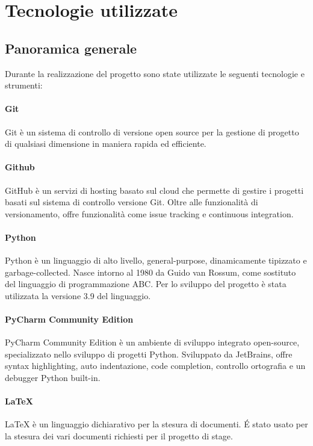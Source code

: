 
\chapter{Tecnologie utilizzate}

\section{Panoramica generale}
Durante la realizzazione del progetto sono state utilizzate le seguenti tecnologie e strumenti:

\subsubsection{Git} 
Git è un sistema di controllo di versione open source per la gestione di progetto di qualsiasi dimensione in maniera rapida ed efficiente. 

\subsubsection{Github}
GitHub è un servizi di hosting basato sul cloud che permette di gestire i progetti basati sul sistema di controllo versione Git. Oltre alle funzionalità di versionamento, offre funzionalità come issue tracking e continuous integration. 


\subsubsection{Python}
Python è un linguaggio di alto livello, general-purpose, dinamicamente tipizzato e garbage-collected. Nasce intorno al 1980 da Guido van Rossum, come sostituto del linguaggio di programmazione ABC. Per lo sviluppo del progetto è stata utilizzata la versione 3.9 del linguaggio.


\subsubsection{PyCharm Community Edition}
PyCharm Community Edition è un ambiente di sviluppo integrato open-source, specializzato nello sviluppo di progetti Python. Sviluppato da JetBrains, offre syntax highlighting, auto indentazione, code completion, controllo ortografia e un debugger Python built-in.

\subsubsection{\LaTeX}
\LaTeX{} è un linguaggio dichiarativo per la stesura di documenti. \'E stato usato per la
stesura dei vari documenti richiesti per il progetto di stage.


